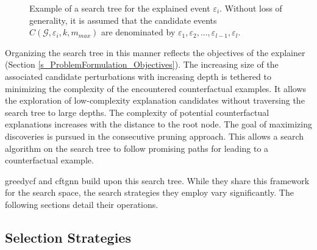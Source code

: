 

\begin{figure} [ht]
    \centering
    
    \caption{Example of a search tree for the explained event $\varepsilon_i$. Without loss of generality, it is assumed that the candidate events $C(\mathcal{G}, \varepsilon_i, k, m_{max})$ are denominated by $\varepsilon_1, \varepsilon_2, ..., \varepsilon_{l - 1}, \varepsilon_{l}$.}
    \label{f_SearchTree_Example}
\end{figure}

Organizing the search tree in this manner reflects the objectives of the explainer (Section \ref{s_ProblemFormulation_Objectives}). The increasing size of the associated candidate perturbations with increasing depth is tethered to minimizing the complexity of the encountered counterfactual examples. It allows the exploration of low-complexity explanation candidates without traversing the search tree to large depths. The complexity of potential counterfactual explanations increases with the distance to the root node. The goal of maximizing discoveries is pursued in the consecutive pruning approach. This allows a search algorithm on the search tree to follow promising paths for leading to a counterfactual example.

\gls{greedycf} and \gls{cftgnn} build upon this search tree. While they share this framework for the search space, the search strategies they employ vary significantly. The following sections detail their operations.



\subsection{Selection Strategies}
\label{s_Methodology_SelectionStrategies}

